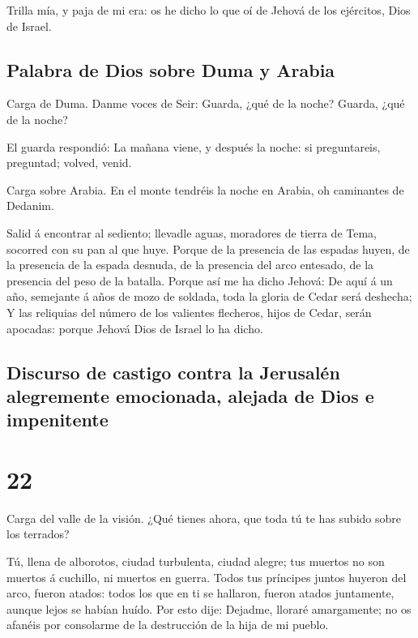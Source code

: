  Trilla mía, y paja de mi era: os he dicho lo que oí de
Jehová de los ejércitos, Dios de Israel.

\hypertarget{palabra-de-dios-sobre-duma-y-arabia}{%
\subsection{Palabra de Dios sobre Duma y
Arabia}\label{palabra-de-dios-sobre-duma-y-arabia}}

 Carga de Duma. Danme voces de Seir: Guarda, ¿qué de la
noche? Guarda, ¿qué de la noche?

 El guarda respondió: La mañana viene, y después la
noche: si preguntareis, preguntad; volved, venid.

 Carga sobre Arabia. En el monte tendréis la noche en
Arabia, oh caminantes de Dedanim.

 Salid á encontrar al sediento; llevadle aguas, moradores
de tierra de Tema, socorred con su pan al que huye. 
Porque de la presencia de las espadas huyen, de la presencia de la
espada desnuda, de la presencia del arco entesado, de la presencia del
peso de la batalla.  Porque así me ha dicho Jehová: De
aquí á un año, semejante á años de mozo de soldada, toda la gloria de
Cedar será deshecha;  Y las reliquias del número de los
valientes flecheros, hijos de Cedar, serán apocadas: porque Jehová Dios
de Israel lo ha dicho.

\hypertarget{discurso-de-castigo-contra-la-jerusaluxe9n-alegremente-emocionada-alejada-de-dios-e-impenitente}{%
\subsection{Discurso de castigo contra la Jerusalén alegremente
emocionada, alejada de Dios e
impenitente}\label{discurso-de-castigo-contra-la-jerusaluxe9n-alegremente-emocionada-alejada-de-dios-e-impenitente}}

\hypertarget{section-21}{%
\section{22}\label{section-21}}

 Carga del valle de la visión. ¿Qué tienes ahora, que toda
tú te has subido sobre los terrados?

 Tú, llena de alborotos, ciudad turbulenta, ciudad alegre;
tus muertos no son muertos á cuchillo, ni muertos en guerra.
 Todos tus príncipes juntos huyeron del arco, fueron
atados: todos los que en ti se hallaron, fueron atados juntamente,
aunque lejos se habían huído.  Por esto dije: Dejadme,
lloraré amargamente; no os afanéis por consolarme de la destrucción de
la hija de mi pueblo.

